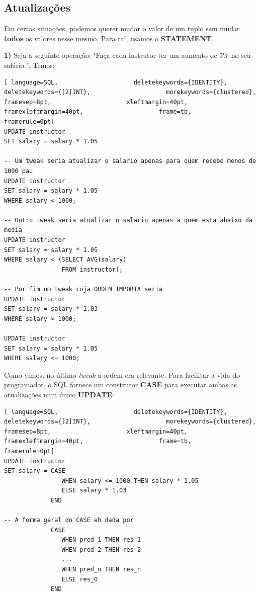 \documentclass[oneside]{book}
\theoremstyle{definition}
\begin{document}
\subsection{Atualizações}
Em certas situações, podemos querer mudar o valor de um tuplo sem mudar \textbf{todos} os valores nesse mesmo. Para tal, usamos o \textbf{STATEMENT}.

\textbf{1)} Seja a seguinte operação: "Faça cada instrutor ter um aumento de 5\% no seu salário.". Temos:
\begin{lstlisting}[ language=SQL,                     deletekeywords={IDENTITY},                     deletekeywords={[2]INT},                     morekeywords={clustered},                     framesep=8pt,                     xleftmargin=40pt,                     framexleftmargin=40pt,                     frame=tb,                     framerule=0pt]
UPDATE instructor
SET salary = salary * 1.05

-- Um tweak seria atualizar o salario apenas para quem recebe menos de 1000 pau
UPDATE instructor
SET salary = salary * 1.05
WHERE salary < 1000;

-- Outro tweak seria atualizar o salario apenas a quem esta abaixo da media
UPDATE instructor
SET salary = salary * 1.05
WHERE salary < (SELECT AVG(salary)
                FROM instructor);

-- Por fim um tweak cuja ORDEM IMPORTA seria
UPDATE instructor
SET salary = salary * 1.03
WHERE salary > 1000;

UPDATE instructor
SET salary = salary * 1.05
WHERE salary <= 1000;
\end{lstlisting}

Como vimos, no último \textit{tweak} a ordem era relevante. Para facilitar a vida do programador, o SQL fornece um construtor \textbf{CASE} para executar ambas as atualizações num único \textbf{UPDATE}:
\begin{lstlisting}[ language=SQL,                     deletekeywords={IDENTITY},                     deletekeywords={[2]INT},                     morekeywords={clustered},                     framesep=8pt,                     xleftmargin=40pt,                     framexleftmargin=40pt,                     frame=tb,                     framerule=0pt]
UPDATE instructor
SET salary = CASE
                WHEN salary <= 1000 THEN salary * 1.05
                ELSE salary * 1.03
             END

-- A forma geral do CASE eh dada por
             CASE
                WHEN pred_1 THEN res_1
                WHEN pred_2 THEN res_2
                ...
                WHEN pred_n THEN res_n
                ELSE res_0
             END
\end{lstlisting}
\end{document}
